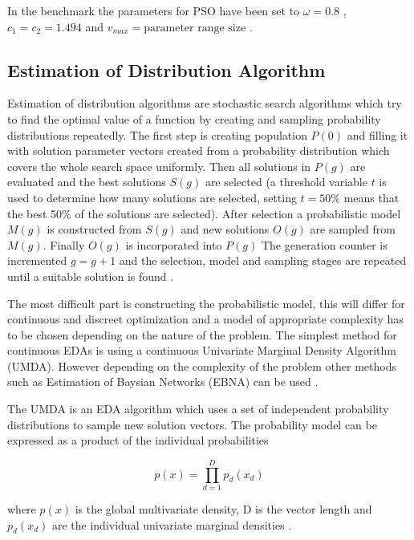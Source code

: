 In the benchmark the parameters for PSO have been set to $\omega = 0.8$ \cite{shi1998modified}, $c_1 = c_2 = 1.494$ \cite{kennedy1999small} and $v_{max} = \text{parameter range size}$ \cite{Das2008}.

\subsection{Estimation of Distribution Algorithm}

Estimation of distribution algorithms are stochastic search algorithms which try to find the optimal value of a function by creating and sampling probability distributions repeatedly. The first step is creating population $P(0)$ and filling it with solution parameter vectors created from a probability distribution which covers the whole search space uniformly. Then all solutions in $P(g)$ are evaluated and the best solutions $S(g)$ are selected (a threshold variable $t$ is used to determine how many solutions are selected, setting $t=50\%$ means that the best 50\% of the solutions are selected). After selection a probabilistic model $M(g)$ is constructed from $S(g)$ and new solutions $O(g)$ are sampled from $M(g)$. Finally $O(g)$ is incorporated into $P(g)$ The generation counter is incremented $g = g + 1$ and the selection, model and sampling stages are repeated until a suitable solution is found \cite{Hauschild2011111}.

The most difficult part is constructing the probabilistic model, this will differ for continuous and discreet optimization and a model of appropriate complexity has to be chosen depending on the nature of the problem. The simplest method for continuous EDAs is using a continuous Univariate Marginal Density Algorithm (UMDA). However depending on the complexity of the problem other methods such as Estimation of Baysian Networks (EBNA) can be used \cite{larranaga2012review}.

The UMDA is an EDA algorithm which uses a set of independent probability distributions to sample new solution vectors. The probability model can be expressed as a product of the individual probabilities

\begin{equation}
  p(x) = \prod _{d=1}^D {p_d(x_d)}
\end{equation}

where $p(x)$ is the global multivariate density, D is the vector length and $p_d(x_d)$ are the individual univariate marginal densities \cite{povsik2004estimation}.


